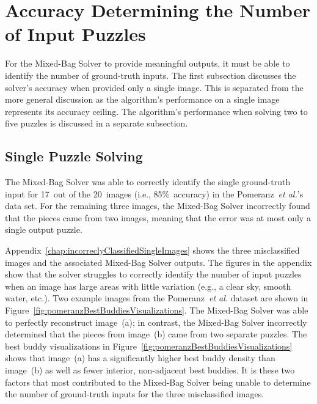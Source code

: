\section{Accuracy Determining the Number of Input Puzzles}

For the Mixed-Bag Solver to provide meaningful outputs, it must be able to identify the number of ground-truth inputs.  The first subsection discusses the solver's accuracy when provided only a single image.  This is separated from the more general discussion as the algorithm's performance on a single image represents its accuracy ceiling.  The algorithm's performance when solving two to five puzzles is discussed in a separate subsection.

\subsection{Single Puzzle Solving}\label{sec:singlePuzzleSolving}

The Mixed-Bag Solver was able to correctly identify the single ground-truth input for 17~out of the 20~images (i.e., 85\%~accuracy) in the Pomeranz~\textit{et al.}'s data set.  For the remaining three images, the Mixed-Bag Solver incorrectly found that the pieces came from two images, meaning that the error was at most only a single output puzzle. 

Appendix~\ref{chap:incorreclyClassifiedSingleImages} shows the three misclassified images and the associated Mixed-Bag Solver outputs. The figures in the appendix show that the solver struggles to correctly identify the number of input puzzles when an image has large areas with little variation (e.g., a clear sky, smooth water, etc.). Two example images from the Pomeranz~\textit{et al.} dataset are shown in Figure~\ref{fig:pomeranzBestBuddiesVisualizations}.  The Mixed-Bag Solver was able to perfectly reconstruct image~(a); in contrast, the Mixed-Bag Solver incorrectly determined that the pieces from image~(b) came from two separate puzzles. The best buddy visualizations in Figure~\ref{fig:pomeranzBestBuddiesVisualizations} shows that image~(a) has a significantly higher best buddy density than image~(b) as well as fewer interior, non-adjacent best buddies.  It is these two factors that most contributed to the Mixed-Bag Solver being unable to determine the number of ground-truth inputs for the three misclassified images. 

